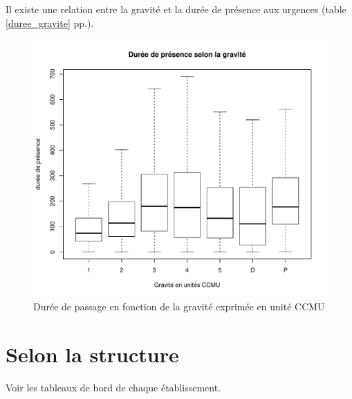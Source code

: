 \documentclass[12pt,english,french,twoside]{book}\usepackage[]{graphicx}\usepackage[]{color}
\makeatletter
\def\maxwidth{ %
  \ifdim\Gin@nat@width>\linewidth
    \linewidth
  \else
    \Gin@nat@width
  \fi
}
\newenvironment{knitrout}{}{} %
\makeatother
\begin{document}
Il existe une relation entre la gravité et la durée de présence aux urgences (table \ref{duree_gravite} pp.\pageref{duree_gravite}).

\begin{figure}[ht!]
 \centering
\begin{knitrout}
\color{fgcolor}
\includegraphics[width=\maxwidth]{figure/duree_gravite2} 

\end{knitrout}

 \caption{Durée de passage en fonction de la gravité exprimée en unité CCMU}
 \label{toucan}
\end{figure}



\section{Selon la structure}

Voir les tableaux de bord de chaque établissement.

% 
% 
% 
% 
% 
\end{document}
